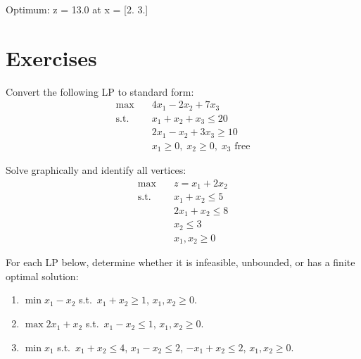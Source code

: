 \begin{codeoutput}
Optimum: z = 13.0 at x = [2. 3.]
\end{codeoutput}

\section{Exercises}

\begin{exercise}
Convert the following LP to standard form:
\[
\begin{aligned}
  \max \quad & 4x_1 - 2x_2 + 7x_3 \\
  \text{s.t.} \quad
    & x_1 + x_2 + x_3 \le 20 \\
    & 2x_1 - x_2 + 3x_3 \ge 10 \\
    & x_1 \ge 0,\; x_2 \ge 0,\; x_3 \text{ free}
\end{aligned}
\]
\end{exercise}

\begin{exercise}
Solve graphically and identify all vertices:
\[
\begin{aligned}
  \max \quad & z = x_1 + 2x_2 \\
  \text{s.t.} \quad
    & x_1 + x_2 \le 5 \\
    & 2x_1 + x_2 \le 8 \\
    & x_2 \le 3 \\
    & x_1, x_2 \ge 0
\end{aligned}
\]
\end{exercise}

\begin{exercise}
For each LP below, determine whether it is infeasible, unbounded, or has a
finite optimal solution:
\begin{enumerate}
  \item $\min x_1 - x_2$ s.t.\ $x_1 + x_2 \ge 1$, $x_1, x_2 \ge 0$.
  \item $\max 2x_1 + x_2$ s.t.\ $x_1 - x_2 \le 1$, $x_1, x_2 \ge 0$.
  \item $\min x_1$ s.t.\ $x_1 + x_2 \le 4$, $x_1 - x_2 \le 2$,
        $-x_1 + x_2 \le 2$, $x_1, x_2 \ge 0$.
\end{enumerate}
\end{exercise}

